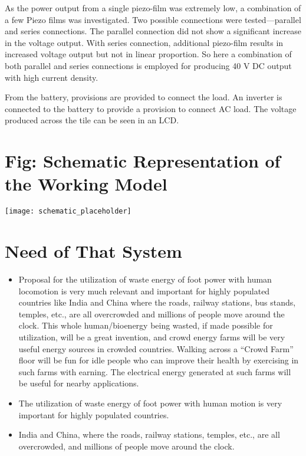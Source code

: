 \documentclass[12pt]{article}
\begin{document}
As the power output from a single piezo-film was extremely low, a combination of a few Piezo films was investigated. Two possible connections were tested—parallel and series connections. The parallel connection did not show a significant increase in the voltage output. With series connection, additional piezo-film results in increased voltage output but not in linear proportion. So here a combination of both parallel and series connections is employed for producing 40 V DC output with high current density. 

From the battery, provisions are provided to connect the load. An inverter is connected to the battery to provide a provision to connect AC load. The voltage produced across the tile can be seen in an LCD.


\newpage


\section*{Fig: Schematic Representation of the Working Model}

\begin{center}
\texttt{[image: schematic\_placeholder]} %
\end{center}

\section*{Need of That System}

\begin{itemize}[leftmargin=1.5cm]
    \item Proposal for the utilization of waste energy of foot power with human locomotion is very much relevant and important for highly populated countries like India and China where the roads, railway stations, bus stands, temples, etc., are all overcrowded and millions of people move around the clock. This whole human/bioenergy being wasted, if made possible for utilization, will be a great invention, and crowd energy farms will be very useful energy sources in crowded countries. Walking across a ``Crowd Farm'' floor will be fun for idle people who can improve their health by exercising in such farms with earning. The electrical energy generated at such farms will be useful for nearby applications.
    
    \item The utilization of waste energy of foot power with human motion is very important for highly populated countries.
    
    \item India and China, where the roads, railway stations, temples, etc., are all overcrowded, and millions of people move around the clock.
\end{itemize}
\end{document}
